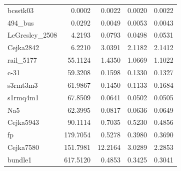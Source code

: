 \begin{table}[ht!]
	\centering
	\begin{tabular}{|>{\footnotesize}l|>{\raggedleft\arraybackslash\footnotesize}r|>{\raggedleft\arraybackslash\footnotesize}r|>{\raggedleft\arraybackslash\footnotesize}r|>{\raggedleft\arraybackslash\footnotesize}r|}
		\hline
		\multicolumn{1}{|>{\centering\footnotesize}c|}{Matrix} & \multicolumn{1}{>{\centering\footnotesize}c|}{CM} & \multicolumn{1}{>{\centering\footnotesize}c|}{ICM8} & \multicolumn{1}{>{\centering\footnotesize}c|}{ICM16} & \multicolumn{1}{>{\centering\footnotesize}c|}{ICM32} \\ \hline
		bcsstk03        & \cellcolor{green!25}0.0002 &  0.0022 &                     0.0020 &                     0.0022 \\
		494\_bus 		&                     0.0292 &  0.0049 &                     0.0053 & \cellcolor{green!25}0.0043 \\
		LeGresley\_2508 &                     4.2193 &  0.0793 & \cellcolor{green!25}0.0498 &                     0.0531 \\
		Cejka2842		&                     6.2210 &  3.0391 & \cellcolor{green!25}2.1182 &                     2.1412 \\
		rail\_5177      &                    55.1124 &  1.4350 & \cellcolor{green!25}1.0669 &                     1.1022 \\
		c-31		    &                    59.3208 &  0.1598 &                     0.1330 & \cellcolor{green!25}0.1327 \\
		s3rmt3m3        &                    61.9867 &  0.1450 & \cellcolor{green!25}0.1133 &                     0.1684 \\
		s1rmq4m1        &                    67.8509 &  0.0641 & \cellcolor{green!25}0.0502 &                     0.0505 \\
		Na5             &                    62.3995 &  0.0817 & \cellcolor{green!25}0.0636 &                     0.0649 \\
		Cejka5943		&                    90.1114 &  0.7035 &                     0.5230 & \cellcolor{green!25}0.4856 \\
		fp              &                   179.7054 &  0.5278 &                     0.3980 & \cellcolor{green!25}0.3690 \\
		Cejka7580		&                   151.7981 & 12.2164 &                     3.0289 & \cellcolor{green!25}2.2853 \\
		bundle1         &                   617.5120 &  0.4853 &                     0.3425 & \cellcolor{green!25}0.3041 \\

\end{tabular}
\end{table}
